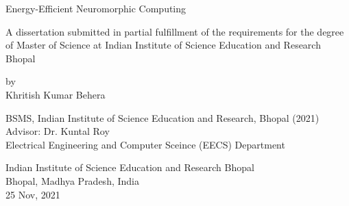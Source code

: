 \documentclass[a4paper, 12pt]{book}
\begin{document}
\thispagestyle{empty}

\thispagestyle{empty}
\cleardoublepage

\thispagestyle{empty}

\thispagestyle{empty}
\cleardoublepage



{}
{}
\begin{titlepage}
\noindent
\begin{center}
\vspace*{0.5mm}
{{\large{Energy-Efficient Neuromorphic Computing}}}

\vspace{1cm}

\large{A dissertation submitted in partial fulfillment of the requirements for the degree of Master of Science at Indian Institute of Science Education and Research Bhopal}

\vspace{4cm}

\large{by}\\
\vspace{0.5cm}
\large{Khritish Kumar Behera}\\
\begin{large}
{BSMS, Indian Institute of Science Education and Research, Bhopal (2021)}\\
\vspace{1.5cm}
Advisor: Dr. Kuntal Roy\\
Electrical Engineering and Computer Sceince (EECS) Department
\end{large}

\vspace{3cm}
\begin{large}
Indian Institute of Science Education and Research Bhopal\\
Bhopal, Madhya Pradesh, India\\
25 Nov, 2021
\end{large}
\end{center}

\end{titlepage}
\cleardoublepage

{}
\tableofcontents
\cleardoublepage

{}
\listoffigures
\cleardoublepage

{}
\listoftables
\cleardoublepage
\end{document}
